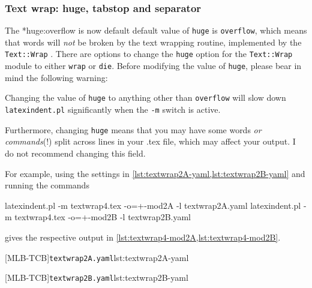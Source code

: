 \documentclass[10pt]{article}
\begin{document}
\subsubsection{Text wrap: huge, tabstop and separator}
 The *{huge:overflow is now default} default value of \texttt{huge}
 is \texttt{overflow}, which means that words will \emph{not} be broken by the text
 wrapping routine, implemented by the \texttt{Text::Wrap} \cite{textwrap}. There are
 options to change the \texttt{huge} option for the \texttt{Text::Wrap} module to either
 \texttt{wrap} or \texttt{die}. Before modifying the value of \texttt{huge}, please bear
 in mind the following warning: %
 \begin{warning}
  \raggedright
  Changing the value of \texttt{huge} to anything other than \texttt{overflow} will slow
  down \texttt{latexindent.pl} significantly when the \texttt{-m} switch is active.

  Furthermore, changing \texttt{huge} means that you may have some words \emph{or
  commands}(!) split across lines in your .tex file, which may affect your output. I do
  not recommend changing this field.
 \end{warning}

 \begin{example}
 For example, using the settings in \cref{lst:textwrap2A-yaml,lst:textwrap2B-yaml} and
 running the commands  

 \begin{commandshell}
	 latexindent.pl -m textwrap4.tex -o=+-mod2A -l textwrap2A.yaml
	 latexindent.pl -m textwrap4.tex -o=+-mod2B -l textwrap2B.yaml
\end{commandshell}

 gives the respective output in \cref{lst:textwrap4-mod2A,lst:textwrap4-mod2B}.

 \begin{cmhtcbraster}[raster column skip=.1\linewidth]
  [MLB-TCB]{\texttt{textwrap2A.yaml}}{lst:textwrap2A-yaml}

  [MLB-TCB]{\texttt{textwrap2B.yaml}}{lst:textwrap2B-yaml}
 \end{cmhtcbraster}
 \end{example}
\end{document}
